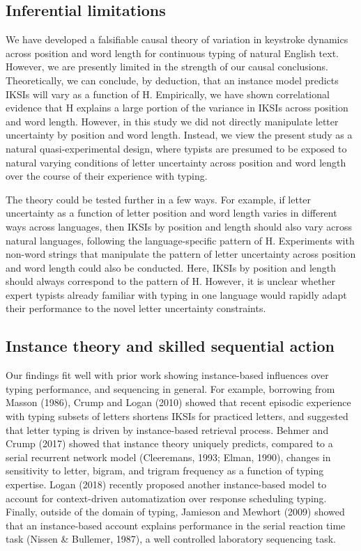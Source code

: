 \documentclass[floatsintext,man]{apa6}
\theoremstyle{definition}
\theoremstyle{definition}
\theoremstyle{definition}
\theoremstyle{remark}
\begin{document}
\subsection{Inferential limitations}\label{inferential-limitations}

We have developed a falsifiable causal theory of variation in keystroke
dynamics across position and word length for continuous typing of
natural English text. However, we are presently limited in the strength
of our causal conclusions. Theoretically, we can conclude, by deduction,
that an instance model predicts IKSIs will vary as a function of H.
Empirically, we have shown correlational evidence that H explains a
large portion of the variance in IKSIs across position and word length.
However, in this study we did not directly manipulate letter uncertainty
by position and word length. Instead, we view the present study as a
natural quasi-experimental design, where typists are presumed to be
exposed to natural varying conditions of letter uncertainty across
position and word length over the course of their experience with
typing.

The theory could be tested further in a few ways. For example, if letter
uncertainty as a function of letter position and word length varies in
different ways across languages, then IKSIs by position and length
should also vary across natural languages, following the
language-specific pattern of H. Experiments with non-word strings that
manipulate the pattern of letter uncertainty across position and word
length could also be conducted. Here, IKSIs by position and length
should always correspond to the pattern of H. However, it is unclear
whether expert typists already familiar with typing in one language
would rapidly adapt their performance to the novel letter uncertainty
constraints.

\subsection{Instance theory and skilled sequential
action}\label{instance-theory-and-skilled-sequential-action}

Our findings fit well with prior work showing instance-based influences
over typing performance, and sequencing in general. For example,
borrowing from Masson (1986), Crump and Logan (2010) showed that recent
episodic experience with typing subsets of letters shortens IKSIs for
practiced letters, and suggested that letter typing is driven by
instance-based retrieval process. Behmer and Crump (2017) showed that
instance theory uniquely predicts, compared to a serial recurrent
network model (Cleeremans, 1993; Elman, 1990), changes in sensitivity to
letter, bigram, and trigram frequency as a function of typing expertise.
Logan (2018) recently proposed another instance-based model to account
for context-driven automatization over response scheduling typing.
Finally, outside of the domain of typing, Jamieson and Mewhort (2009)
showed that an instance-based account explains performance in the serial
reaction time task (Nissen \& Bullemer, 1987), a well controlled
laboratory sequencing task.
\end{document}
